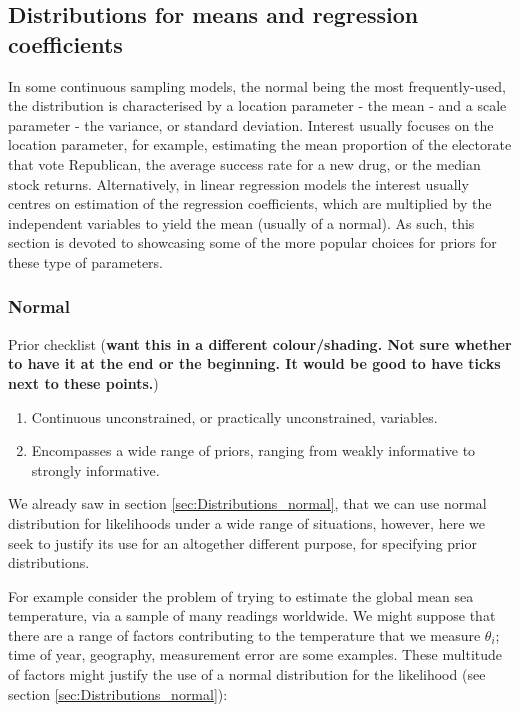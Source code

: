 \documentclass[11pt,fullpage]{book}
\begin{document}
\subsection{Distributions for means and regression coefficients}
In some continuous sampling models, the normal being the most frequently-used, the distribution is characterised by a location parameter - the mean - and a scale parameter - the variance, or standard deviation. Interest usually focuses on the location parameter, for example, estimating the mean proportion of the electorate that vote Republican, the average success rate for a new drug, or the median stock returns. Alternatively, in linear regression models the interest usually centres on estimation of the regression coefficients, which are multiplied by the independent variables to yield the mean (usually of a normal). As such, this section is devoted to showcasing some of the more popular choices for priors for these type of parameters.

\subsubsection{Normal}
Prior checklist (\textbf{want this in a different colour/shading. Not sure whether to have it at the end or the beginning. It would be good to have ticks next to these points.})

\begin{enumerate} 
\item Continuous unconstrained, or practically unconstrained, variables.
\item Encompasses a wide range of priors, ranging from weakly informative to strongly informative.
\end{enumerate}

We already saw in section \ref{sec:Distributions_normal}, that we can use normal distribution for likelihoods under a wide range of situations, however, here we seek to justify its use for an altogether different purpose, for specifying prior distributions. 

For example consider the problem of trying to estimate the global mean sea temperature, via a sample of many readings worldwide. We might suppose that there are a range of factors contributing to the temperature that we measure $\theta_i$; time of year, geography, measurement error are some examples. These multitude of factors might justify the use of a normal distribution for the likelihood (see section \ref{sec:Distributions_normal}):
\end{document}
